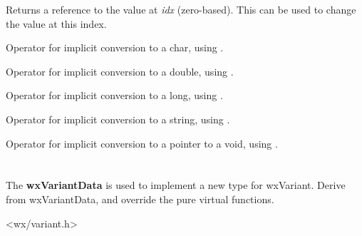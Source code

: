 
Returns a reference to the value at {\it idx} (zero-based). This can be used
to change the value at this index.

\label{wxvariantchar}


Operator for implicit conversion to a char, using .

\label{wxvariantdouble}


Operator for implicit conversion to a double, using .


Operator for implicit conversion to a long, using .

\label{wxvariantwxstring}


Operator for implicit conversion to a string, using .

\label{wxvariantvoid}


Operator for implicit conversion to a pointer to a void, using .

\section{}\label{wxvariantdata}

The {\bf wxVariantData} is used to implement a new type for wxVariant. Derive from wxVariantData,
and override the pure virtual functions.




<wx/variant.h>



